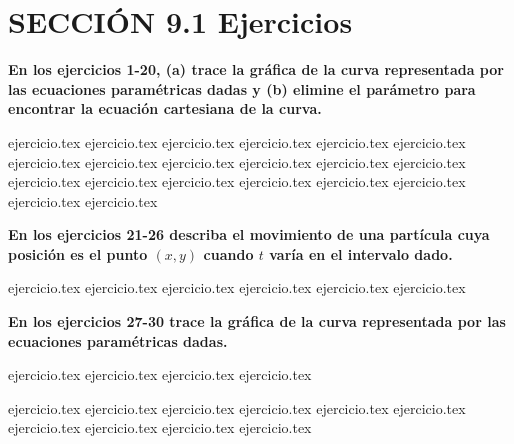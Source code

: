 
\section*{SECCIÓN 9.1 \quad Ejercicios}

\noindent\textbf{En los ejercicios 1-20, (a) trace la gráfica de la curva representada por las ecuaciones paramétricas dadas y (b) elimine el parámetro para encontrar la ecuación cartesiana de la curva.}
\begin{enumerate}
    {ejercicio.tex}
{ejercicio.tex}
{ejercicio.tex}
{ejercicio.tex}
{ejercicio.tex}
{ejercicio.tex}
{ejercicio.tex}
{ejercicio.tex}
{ejercicio.tex}
{ejercicio.tex}
{ejercicio.tex}
{ejercicio.tex}
{ejercicio.tex}
{ejercicio.tex}
{ejercicio.tex}
{ejercicio.tex}
{ejercicio.tex}
{ejercicio.tex}
{ejercicio.tex}
{ejercicio.tex}
\end{enumerate}

\vspace{0.5cm}
\noindent\textbf{En los ejercicios 21-26 describa el movimiento de una partícula cuya posición es el punto $(x, y)$ cuando $t$ varía en el intervalo dado.}
\begin{enumerate}
    \setcounter{enumi}{20}
    {ejercicio.tex}
{ejercicio.tex}
{ejercicio.tex}
{ejercicio.tex}
{ejercicio.tex}
{ejercicio.tex}
\end{enumerate}

\vspace{0.5cm}
\noindent\textbf{En los ejercicios 27-30 trace la gráfica de la curva representada por las ecuaciones paramétricas dadas.}
\begin{enumerate}
    \setcounter{enumi}{26}
    {ejercicio.tex}
{ejercicio.tex}
{ejercicio.tex}
{ejercicio.tex}
\end{enumerate}

\vspace{0.5cm}
\begin{enumerate}
    \setcounter{enumi}{30}
    {ejercicio.tex}
{ejercicio.tex}
{ejercicio.tex}
{ejercicio.tex}
{ejercicio.tex}
{ejercicio.tex}
{ejercicio.tex}
{ejercicio.tex}
{ejercicio.tex}
{ejercicio.tex}
\end{enumerate}
